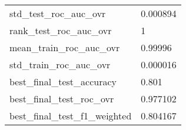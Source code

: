 \begin{tabular}{ll}
std\_test\_roc\_auc\_ovr          &                                           0.000894 \\
rank\_test\_roc\_auc\_ovr         &                                                  1 \\
mean\_train\_roc\_auc\_ovr        &                                            0.99996 \\
std\_train\_roc\_auc\_ovr         &                                           0.000016 \\
best\_final\_test\_accuracy      &                                              0.801 \\
best\_final\_test\_roc\_ovr       &                                           0.977102 \\
best\_final\_test\_f1\_weighted   &                                           0.804167 \\
\bottomrule
\end{tabular}
